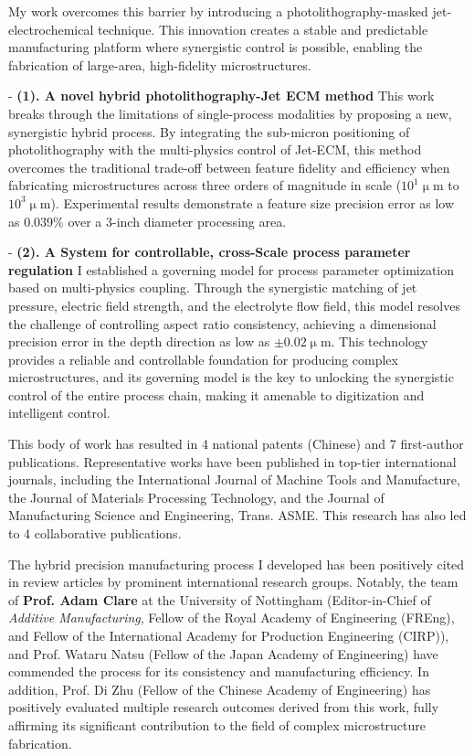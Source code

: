\documentclass{ResearchStatement}
\begin{document}
My work overcomes this barrier by introducing a photolithography-masked jet-electrochemical technique. This innovation creates a stable and predictable manufacturing platform where synergistic control is possible, enabling the fabrication of large-area, high-fidelity microstructures.

- \textbf{(1). A novel hybrid photolithography-Jet ECM method}
This work breaks through the limitations of single-process modalities by proposing a new, synergistic hybrid process. By integrating the sub-micron positioning of photolithography with the multi-physics control of Jet-ECM, this method overcomes the traditional trade-off between feature fidelity and efficiency when fabricating microstructures across three orders of magnitude in scale ($10^1 \upmu$m to $10^3 \upmu$m). Experimental results demonstrate a feature size precision error as low as 0.039\% over a 3-inch diameter processing area.

- \textbf{(2). A System for controllable, cross-Scale process parameter regulation}
I established a governing model for process parameter optimization based on multi-physics coupling. Through the synergistic matching of jet pressure, electric field strength, and the electrolyte flow field, this model resolves the challenge of controlling aspect ratio consistency, achieving a dimensional precision error in the depth direction as low as $\pm 0.02 \upmu$m. This technology provides a reliable and controllable foundation for producing complex microstructures, and its governing model is the key to unlocking the synergistic control of the entire process chain, making it amenable to digitization and intelligent control.

This body of work has resulted in 4 national patents (Chinese) and 7 first-author publications. Representative works have been published in top-tier international journals, including the International Journal of Machine Tools and Manufacture, the Journal of Materials Processing Technology, and the Journal of Manufacturing Science and Engineering, Trans. ASME. This research has also led to 4 collaborative publications.

The hybrid precision manufacturing process I developed has been positively cited in review articles by prominent international research groups. Notably, the team of \textbf{Prof. Adam Clare} at the University of Nottingham (Editor-in-Chief of \textit{Additive Manufacturing}, Fellow of the Royal Academy of Engineering (FREng), and Fellow of the International Academy for Production Engineering (CIRP)), and Prof. Wataru Natsu (Fellow of the Japan Academy of Engineering) have commended the process for its consistency and manufacturing efficiency. In addition, Prof. Di Zhu (Fellow of the Chinese Academy of Engineering) has positively evaluated multiple research outcomes derived from this work, fully affirming its significant contribution to the field of complex microstructure fabrication.
\end{document}
